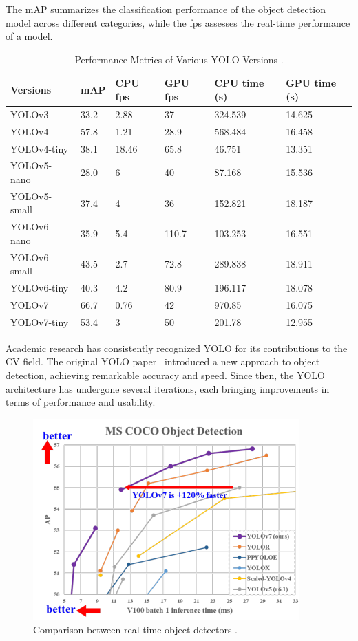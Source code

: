 The mAP summarizes the classification performance of the object detection model across different categories, while the fps assesses the real-time performance of a model.

\begin{table}[H]
    \caption[Performance Metrics of Various YOLO Versions]{Performance Metrics of Various YOLO Versions \cite{YOLO_compare}.}
    \label{tab:yolo_performance}
    \centering
    \begin{tabular}{|l|l|l|l|l|l|}
        \hline
        Versions & mAP & CPU fps & GPU fps & CPU time (s) & GPU time (s) \\ \hline
        YOLOv3 & 33.2 & 2.88 & 37 & 324.539 & 14.625 \\
        YOLOv4 & 57.8 & 1.21 & 28.9 & 568.484 & 16.458 \\
        YOLOv4-tiny & 38.1 & 18.46 & 65.8 & 46.751 & 13.351 \\
        YOLOv5-nano & 28.0 & 6 & 40 & 87.168 & 15.536 \\
        YOLOv5-small & 37.4 & 4 & 36 & 152.821 & 18.187 \\
        YOLOv6-nano & 35.9 & 5.4 & 110.7 & 103.253 & 16.551 \\
        YOLOv6-small & 43.5 & 2.7 & 72.8 & 289.838 & 18.911 \\
        YOLOv6-tiny & 40.3 & 4.2 & 80.9 & 196.117 & 18.078 \\
        YOLOv7 & 66.7 & 0.76 & 42 & 970.85 & 16.075 \\
        YOLOv7-tiny & 53.4 & 3 & 50 & 201.78 & 12.955 \\ \hline
    \end{tabular}
\end{table}


Academic research has consistently recognized YOLO for its contributions to the CV field.
The original YOLO paper~\cite{YOLO} introduced a new approach to object detection, achieving remarkable accuracy and speed.
Since then, the YOLO architecture has undergone several iterations, each bringing improvements in terms of performance and usability.

\begin{figure}[H]
    \centering
    \includegraphics[width=0.6\linewidth]{figures/yolov7}
    \caption[Comparison between real-time object detectors]{Comparison between real-time object detectors \cite{yolov7}.}
    \label{fig:yolov7}
\end{figure}

